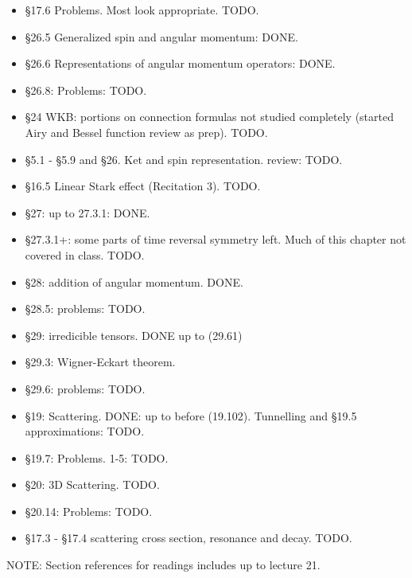 \begin{itemize}
\item \S 17.6 Problems.  Most look appropriate.  TODO.
\item \S 26.5 Generalized spin and angular momentum: DONE.
\item \S 26.6 Representations of angular momentum operators: DONE.
\item \S 26.8: Problems: TODO.
\item \S 24 WKB: portions on connection formulas not studied completely (started Airy and Bessel function review as prep).  TODO.
\item \S 5.1 - \S 5.9 and \S 26.  Ket and spin representation.  review: TODO.
\item \S 16.5 Linear Stark effect (Recitation 3).  TODO.
\item \S 27: up to 27.3.1: DONE.
\item \S 27.3.1+: some parts of time reversal symmetry left.  Much of this chapter not covered in class.  TODO.
\item \S 28: addition of angular momentum.  DONE.
\item \S 28.5: problems: TODO.
\item \S 29: irredicible tensors.  DONE up to (29.61)
\item \S 29.3: Wigner-Eckart theorem.
\item \S 29.6: problems: TODO.
\item \S 19: Scattering.  DONE: up to before (19.102).  Tunnelling and \S 19.5 approximations: TODO.
\item \S 19.7: Problems. 1-5: TODO.
\item \S 20: 3D Scattering. TODO.
\item \S 20.14: Problems: TODO.
\item \S 17.3 - \S 17.4 scattering cross section, resonance and decay.  TODO.
\end{itemize}

NOTE: Section references for readings includes up to lecture 21.
